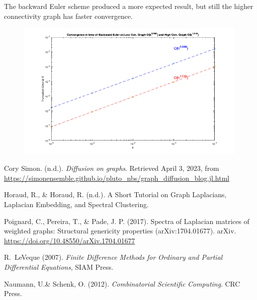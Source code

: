 \documentclass[11pt]{article}
\begin{document}
The backward Euler scheme produced a more expected result, but still the higher connectivity graph has faster convergence. 
\begin{figure}[H]
    \begin{center}
      \includegraphics[width=\textwidth]{BackwardEuler.png}
    \end{center}
  \end{figure}





\begin{thebibliography}{3}  %

    Cory Simon. (n.d.). \emph{Diffusion on graphs}. Retrieved April 3, 2023, from \href{https://simonensemble.github.io/pluto_nbs/graph_diffusion_blog.jl.html}{https://simonensemble.github.io/pluto\_nbs/graph\_diffusion\_blog.jl.html}
    

     Horaud, R., \& Horaud, R. (n.d.). A Short Tutorial on Graph Laplacians, Laplacian Embedding, and Spectral Clustering.
  

 Poignard, C., Pereira, T., \& Pade, J. P. (2017). Spectra of Laplacian matrices of weighted graphs: Structural genericity properties (arXiv:1704.01677). arXiv. \href{https://doi.org/10.48550/arXiv.1704.01677}{https://doi.org/10.48550/arXiv.1704.01677}

R.~LeVeque (2007).
\textit{Finite Difference Methods for Ordinary and Partial Differential Equations},
SIAM Press.



Naumann, U.\& Schenk, O. (2012). \emph{Combinatorial Scientific Computing}. CRC Press.



\end{thebibliography}
\end{document}
